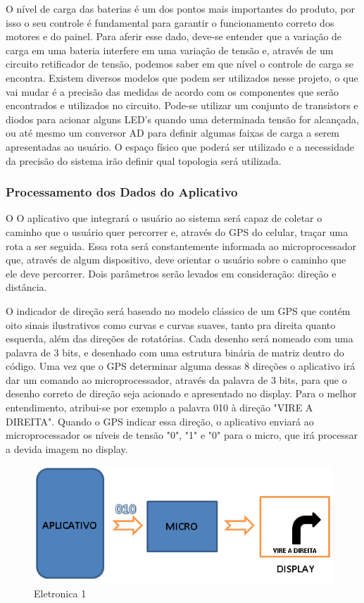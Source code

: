 O nível de carga das baterias é um dos pontos mais importantes do produto, por isso o seu controle é fundamental para garantir o funcionamento correto dos motores e do painel. Para aferir esse dado, deve-se entender que a variação de carga em uma bateria interfere em uma variação de tensão e, através de um circuito retificador de tensão, podemos saber em que nível o controle de carga se encontra. Existem diversos modelos que podem ser utilizados nesse projeto, o que vai mudar é a precisão das medidas de acordo com os componentes que serão encontrados e utilizados no circuito.
Pode-se utilizar um conjunto de transistors e diodos para acionar alguns LED's quando uma determinada tensão for alcançada, ou até mesmo um conversor AD para definir algumas faixas de carga a serem apresentadas ao usuário. O espaço físico que poderá ser utilizado e a necessidade da precisão do sistema irão definir qual topologia será utilizada.


\subsubsection{Processamento dos Dados do Aplicativo}
O O aplicativo que integrará o usuário ao sistema será capaz de coletar o caminho que o usuário quer percorrer e, através do GPS do celular, traçar uma rota a ser seguida. Essa rota será constantemente informada ao microprocessador que, através de algum dispositivo, deve orientar o usuário sobre o caminho que ele deve percorrer. Dois parâmetros serão levados em consideração: direção e distância.

O indicador de direção será baseado no modelo clássico de um GPS que contém oito sinais ilustrativos como curvas e curvas suaves, tanto pra direita quanto esquerda, além das direções de rotatórias. Cada desenho  será nomeado com uma palavra de 3 bits, e desenhado com uma estrutura binária de matriz dentro do código. Uma vez que o GPS determinar alguma dessas 8 direções o aplicativo irá dar um comando ao microprocessador, através da palavra de 3 bits, para que o desenho correto de direção seja acionado e apresentado no display. 
Para o melhor entendimento, atribui-se por exemplo a palavra 010 à direção "VIRE A DIREITA". Quando o GPS indicar essa direção, o aplicativo enviará ao microprocessador os níveis de tensão "0", "1" e "0" para o micro, que irá processar a devida imagem no display.

\graphicspath{{figuras/}}
\begin{figure}[h!]
\centering
\includegraphics[scale=0.80]{eletronica1.png}
\caption{Eletronica 1}
\label{img:us}
\end{figure}

